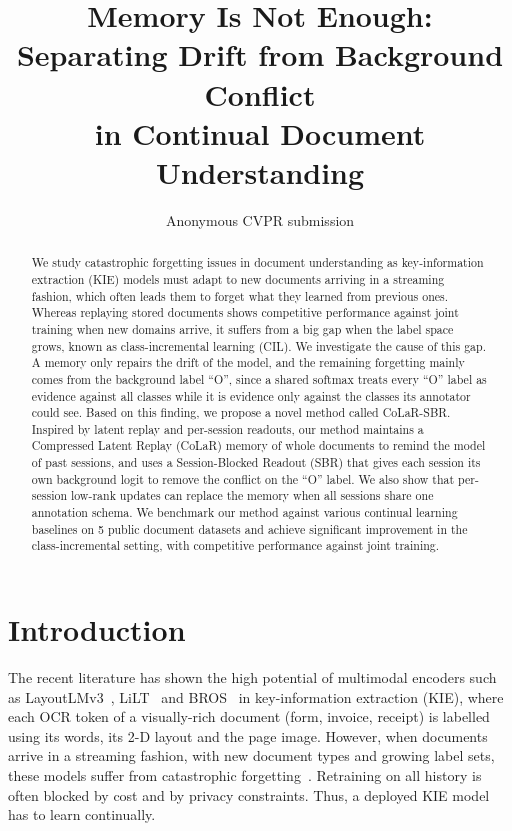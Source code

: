 \documentclass[10pt,twocolumn,letterpaper]{article}
\title{Memory Is Not Enough: Separating Drift from Background Conflict\\in Continual Document Understanding}
\author{Anonymous CVPR submission}
\begin{document}
\maketitle

\begin{abstract}
We study catastrophic forgetting issues in document understanding as key-information extraction (KIE) models must adapt to new documents arriving in a streaming fashion, which often leads them to forget what they learned from previous ones. Whereas replaying stored documents shows competitive performance against joint training when new domains arrive, it suffers from a big gap when the label space grows, known as class-incremental learning (CIL). We investigate the cause of this gap. A memory only repairs the drift of the model, and the remaining forgetting mainly comes from the background label ``O'', since a shared softmax treats every ``O'' label as evidence against all classes while it is evidence only against the classes its annotator could see. Based on this finding, we propose a novel method called CoLaR-SBR. Inspired by latent replay and per-session readouts, our method maintains a Compressed Latent Replay (CoLaR) memory of whole documents to remind the model of past sessions, and uses a Session-Blocked Readout (SBR) that gives each session its own background logit to remove the conflict on the ``O'' label. We also show that per-session low-rank updates can replace the memory when all sessions share one annotation schema. We benchmark our method against various continual learning baselines on 5 public document datasets and achieve significant improvement in the class-incremental setting, with competitive performance against joint training.
\end{abstract}

\section{Introduction}
\label{sec:intro}

The recent literature has shown the high potential of multimodal encoders such as LayoutLMv3~\citep{huang2022layoutlmv3}, LiLT~\citep{wang2022lilt} and BROS~\citep{hong2022bros} in key-information extraction (KIE), where each OCR token of a visually-rich document (form, invoice, receipt) is labelled using its words, its 2-D layout and the page image. However, when documents arrive in a streaming fashion, with new document types and growing label sets, these models suffer from catastrophic forgetting~\citep{mccloskey1989catastrophic}. Retraining on all history is often blocked by cost and by privacy constraints. Thus, a deployed KIE model has to learn continually.
\end{document}
